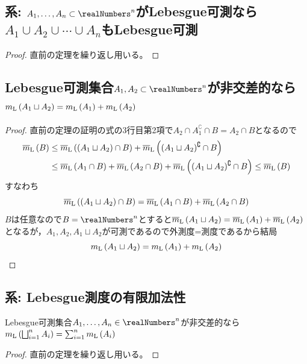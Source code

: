         \subsection{系: \texorpdfstring{$A_1,\dotsc,A_n\subset\realNumbers^n$}{A1,...,An⊂R\string^n}がLebesgue可測なら\texorpdfstring{$A_1\cup A_2\cup\dotsb\cup A_n$}{A1,...,Anの和集合}もLebesgue可測}
            \begin{proof}
                直前の定理を繰り返し用いる。
            \end{proof}
        \subsection{Lebesgue可測集合\texorpdfstring{$A_1,A_2\subset\realNumbers^n$}{A1,A2⊂R\string^n}が非交差的なら\texorpdfstring{$m_\textrm{L}\left(A_1\sqcup A_2\right) = m_\textrm{L}\left(A_1\right) + m_\textrm{L}\left(A_2\right)$}{A1とA2の和集合のLebesgue測度はそれぞれのLebesgue測度の和に等しい}}
            \begin{proof}
                \quad\par
                直前の定理の証明の式の3行目第2項で$A_2\cap A_1^\complement\cap B = A_2\cap B$となるので
                \begin{align*}
                    \protect\overline{m}_\textrm{L}\left(B\right) &\leq \protect\overline{m}_\textrm{L}\left((A_1\sqcup A_2)\cap B\right) + \protect\overline{m}_\textrm{L}\left((A_1\sqcup A_2)^\complement\cap B\right) \\
                    &\leq \protect\overline{m}_\textrm{L}\left(A_1\cap B\right) + \protect\overline{m}_\textrm{L}\left(A_2\cap B\right) + \protect\overline{m}_\textrm{L}\left((A_1\sqcup A_2)^\complement\cap B\right) \leq \protect\overline{m}_\textrm{L}\left(B\right)
                \end{align*}
                すなわち
                \[ \protect\overline{m}_\textrm{L}\left((A_1\sqcup A_2)\cap B\right) = \protect\overline{m}_\textrm{L}\left(A_1\cap B\right) + \protect\overline{m}_\textrm{L}\left(A_2\cap B\right) \]
                $B$は任意なので$B=\realNumbers^n$とすると$\protect\overline{m}_\textrm{L}\left(A_1\sqcup A_2\right) = \protect\overline{m}_\textrm{L}\left(A_1\right) + \protect\overline{m}_\textrm{L}\left(A_2\right)$となるが，$A_1,A_2, A_1\sqcup A_2$が可測であるので外測度=測度であるから結局
                \[ m_\textrm{L}\left(A_1\sqcup A_2\right) = m_\textrm{L}\left(A_1\right) + m_\textrm{L}\left(A_2\right) \]
            \end{proof}
        \subsection{系: Lebesgue測度の有限加法性}
            Lebesgue可測集合$A_1,\dotsc,A_n\in\realNumbers^n$が非交差的なら$m_\textrm{L}\left(\bigsqcup_{i=1}^n A_i\right) = \sum_{i=1}^n m_\textrm{L}\left(A_i\right)$
            \begin{proof}
                直前の定理を繰り返し用いる。
            \end{proof}
